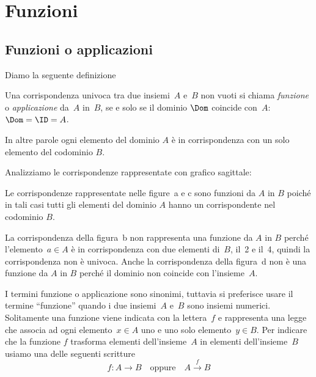 

\chapter{Funzioni}

\section{Funzioni o applicazioni}

Diamo la seguente definizione

\begin{definizione}\label{def:funzione}
 Una corrispondenza univoca tra due insiemi~$A$ e~$B$ non vuoti
si chiama \emph{funzione} o \emph{applicazione} da~$A$ in~$B$, se e solo se il dominio $\Dom$ coincide con~$A$: $\Dom = \ID = A$.
\end{definizione}
In altre parole ogni elemento del dominio $A$ è in corrispondenza con un solo elemento del codominio $B$.
\begin{exrig}
 \begin{esempio}
\label{ex:D.1}
Analizziamo le corrispondenze rappresentate con grafico sagittale:
 \begin{center}
  
 \end{center}

Le corrispondenze rappresentate nelle figure~a e c sono funzioni da $A$ in $B$ poiché in tali casi tutti gli elementi del dominio $A$ hanno un corrispondente nel codominio $B$.

La corrispondenza della figura~b non rappresenta una funzione da $A$ in $B$ perché
l'elemento~$a \in A$ è in corrispondenza con due
elementi di~$B$, il~2 e il~4, quindi la corrispondenza non è univoca.
Anche la corrispondenza della figura~d non è una funzione da $A$ in $B$ perché il
dominio non coincide con l'insieme~$A$.
 \end{esempio}

\end{exrig}

I termini funzione o applicazione sono sinonimi, tuttavia si preferisce
usare il termine ``funzione'' quando i due insiemi~$A$ e~$B$ sono insiemi numerici. Solitamente una funzione
viene indicata con la lettera~$f$ e rappresenta una legge
che associa ad ogni elemento~$x \in A$ uno e uno solo elemento~$y \in B$.
Per indicare che la funzione $f$ trasforma elementi dell'insieme~$A$ in elementi dell'insieme~$B$ usiamo una delle seguenti scritture
\begin{equation*}
f:A \rightarrow B \text{~~~oppure~~~} A\xrightarrow{f}B
\end{equation*}

